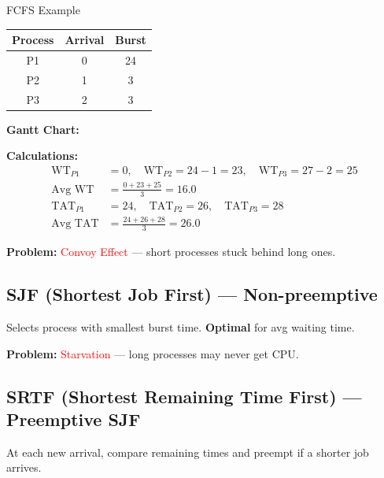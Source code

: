 \documentclass[12pt,a4paper]{article}
\begin{document}
\begin{examplebox}{FCFS Example}
\begin{center}
\begin{tabular}{@{} c c c @{}}
\toprule
\textbf{Process} & \textbf{Arrival} & \textbf{Burst} \\
\midrule
P1 & 0 & 24 \\
P2 & 1 & 3 \\
P3 & 2 & 3 \\
\bottomrule
\end{tabular}
\end{center}

\textbf{Gantt Chart:}
\begin{center}
\end{center}

\textbf{Calculations:}
\begin{align*}
\text{WT}_{P1} &= 0, \quad \text{WT}_{P2} = 24 - 1 = 23, \quad \text{WT}_{P3} = 27 - 2 = 25 \\
\text{Avg WT} &= \frac{0 + 23 + 25}{3} = \boxed{16.0} \\
\text{TAT}_{P1} &= 24, \quad \text{TAT}_{P2} = 26, \quad \text{TAT}_{P3} = 28 \\
\text{Avg TAT} &= \frac{24 + 26 + 28}{3} = \boxed{26.0}
\end{align*}

\textbf{Problem:} \textcolor{red}{Convoy Effect} --- short processes stuck behind long ones.
\end{examplebox}

\subsection{SJF (Shortest Job First) --- Non-preemptive}
Selects process with smallest burst time. \textbf{Optimal} for avg waiting time.

\textbf{Problem:} \textcolor{red}{Starvation} --- long processes may never get CPU.

\subsection{SRTF (Shortest Remaining Time First) --- Preemptive SJF}
At each new arrival, compare remaining times and preempt if a shorter job arrives.
\end{document}

